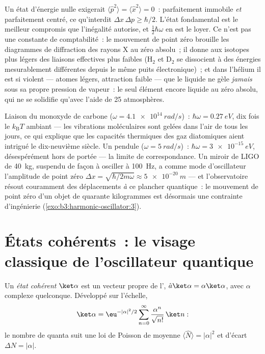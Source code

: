 \begin{remark}\label{rem:b3:harmonic-oscillator:zeropoint}
Un état d'énergie nulle exigerait $\langle\hat p^2\rangle =
\langle\hat x^2\rangle = 0$~: parfaitement immobile \emph{et}
parfaitement centré, ce qu'interdit $\Delta x\,\Delta p \ge \hbar/2$.
L'état fondamental est le meilleur compromis que l'inégalité autorise,
et $\tfrac12\hbar\omega$ en est le loyer. Ce n'est pas une constante de
comptabilité~: le mouvement de point zéro brouille les diagrammes de
diffraction des rayons X au zéro absolu~; il donne aux isotopes plus
légers des liaisons effectives plus faibles (H$_2$ et D$_2$ se
dissocient à des énergies mesurablement différentes depuis le même
puits électronique)~; et dans l'hélium il est si violent --- atomes
légers, attraction faible --- que le liquide ne gèle \emph{jamais} sous
sa propre pression de vapeur~: le seul élément encore liquide au zéro
absolu, qui ne se solidifie qu'avec l'aide de 25 atmosphères.
\end{remark}

\begin{example}\label{ex:b3:harmonic-oscillator:scales}
Liaison du monoxyde de carbone ($\omega = \qty{4.1e14}{rad/s}$)~: $\hbar\omega =
\qty{0.27}{eV}$, dix fois le $k_{\text{B}}T$ ambiant --- les vibrations
moléculaires sont gelées dans l'air de tous les jours, ce qui explique
que les capacités thermiques des gaz diatomiques aient intrigué le
dix-neuvième siècle. Un pendule ($\omega = \qty{5}{rad/s}$)~:
$\hbar\omega = \qty{3e-15}{eV}$, désespérément hors de portée --- la
limite de correspondance. Un miroir de LIGO de \qty{40}{kg}, suspendu
de façon à osciller à \qty{100}{Hz}, a comme mode d'oscillateur l'amplitude de point zéro $\Delta x =
\sqrt{\hbar/2m\omega} \approx \qty{5e-20}{m}$ --- et l'observatoire
résout couramment des déplacements \emph{à} ce plancher quantique~: le
mouvement de point zéro d'un objet de quarante kilogrammes est
désormais une contrainte d'ingénierie
(\cref{exo:b3:harmonic-oscillator:3}).
\end{example}

\section{États cohérents~: le visage classique de l'oscillateur quantique}

\begin{definition}\label{def:b3:harmonic-oscillator:coherent}
Un \emph{état cohérent} $\ket\alpha$ est un vecteur propre de
l', $\hat a\ket\alpha = \alpha\ket\alpha$, avec
$\alpha$ complexe quelconque. Développé sur l'échelle,
\[
\ket\alpha = \eu^{-|\alpha|^2/2}\sum_{n=0}^\infty
\frac{\alpha^n}{\sqrt{n!}}\,\ket n :
\]
le nombre de quanta suit une loi de Poisson de moyenne $\langle\hat
N\rangle = |\alpha|^2$ et d'écart $\Delta N = |\alpha|$.
\end{definition}

